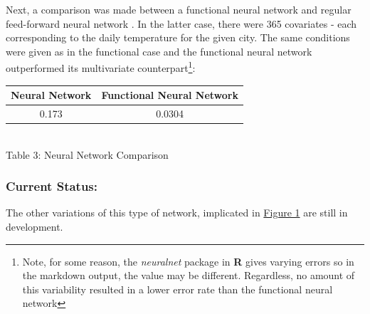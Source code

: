\documentclass{article}
\begin{document}
\noindent Next, a comparison was made between a functional neural network and regular feed-forward neural network \cite{nnInR}. In the latter case, there were 365 covariates - each corresponding to the daily temperature for the given city. The same conditions were given as in the functional case and the functional neural network outperformed its multivariate counterpart\footnote{Note, for some reason, the \textit{neuralnet} package in \textbf{R} gives varying errors so in the markdown output, the value may be different. Regardless, no amount of this variability resulted in a lower error rate than the functional neural network}:
\begin{center}
\label{table:three}
 \begin{tabular}{||c c||} 
 \hline
 Neural Network & Functional Neural Network \\ [1ex] 
 \hline\hline
 0.173 & 0.0304 \\ [1ex] 
 \hline
\end{tabular}\\ \smallskip
Table 3: Neural Network Comparison
\end{center}



\subsubsection{Current Status:}

\noindent The other variations of this type of network, implicated in \hyperref[fig:family]{Figure 1} are still in development.




\end{document}
